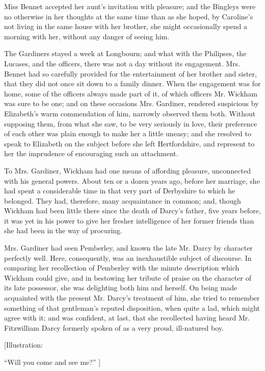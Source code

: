 \documentclass[12pt]{book}
\begin{document}
Miss Bennet accepted her aunt's invitation with pleasure; and the Bingleys were no otherwise in her thoughts at the same time than as she hoped, by Caroline's not living in the same house with her brother, she might occasionally spend a morning with her, without any danger of seeing him.

The Gardiners stayed a week at Longbourn; and what with the Philipses, the Lucases, and the officers, there was not a day without its engagement. Mrs. Bennet had so carefully provided for the entertainment of her brother and sister, that they did not once sit down to a family dinner. When the engagement was for home, some of the officers always made part of it, of which officers Mr. Wickham was sure to be one; and on these occasions Mrs. Gardiner, rendered suspicious by Elizabeth's warm commendation of him, narrowly observed them both. Without supposing them, from what she saw, to be very seriously in love, their preference of each other was plain enough to make her a little uneasy; and she resolved to speak to Elizabeth on the subject before she left Hertfordshire, and represent to her the imprudence of encouraging such an attachment.

To Mrs. Gardiner, Wickham had one means of affording pleasure, unconnected with his general powers. About ten or a dozen years ago, before her marriage, she had spent a considerable time in that very part of Derbyshire to which he belonged. They had, therefore, many acquaintance in common; and, though Wickham had been little there since the death of Darcy's father, five years before, it was yet in his power to give her fresher intelligence of her former friends than she had been in the way of procuring.

Mrs. Gardiner had seen Pemberley, and known the late Mr. Darcy by character perfectly well. Here, consequently, was an inexhaustible subject of discourse. In comparing her recollection of Pemberley with the minute description which Wickham could give, and in bestowing her tribute of praise on the character of its late possessor, she was delighting both him and herself. On being made acquainted with the present Mr. Darcy's treatment of him, she tried to remember something of that gentleman's reputed disposition, when quite a lad, which might agree with it; and was confident, at last, that she recollected having heard Mr. Fitzwilliam Darcy formerly spoken of as a very proud, ill-natured boy.

[Illustration:

``Will you come and see me?'' ]
\end{document}
